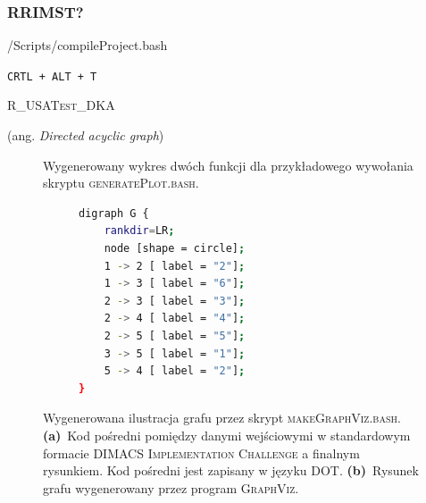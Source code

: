 \subsubsection{RRIMST?}


 \textsf{/Scripts/compileProject.bash}

 \texttt{CRTL + ALT + T}

\textsc{R\_USATest\_DKA}

(ang. \textit{Directed acyclic graph})


\begin{figure}[!htbp]
	\null\hfill
	\hfill\null
	\caption{
		Wygenerowany wykres dwóch funkcji dla przykładowego wywołania skryptu \textsc{generatePlot.bash}.
	}
\end{figure}


\begin{figure}[!htbp]
	\null\hfill
	\begin{subfigure}[b]{0.49\textwidth}
		\footnotesize
		\begin{lstlisting}[language=bash]
digraph G {
	rankdir=LR;
	node [shape = circle];
	1 -> 2 [ label = "2"];
	1 -> 3 [ label = "6"];
	2 -> 3 [ label = "3"];
	2 -> 4 [ label = "4"];
	2 -> 5 [ label = "5"];
	3 -> 5 [ label = "1"];
	5 -> 4 [ label = "2"];
}
		\end{lstlisting}
		\caption{}
		\label{fig:graphViz:a}
	\end{subfigure}
	\hfill
	\begin{subfigure}[b]{0.49\textwidth}
		\vspace{1em}
		\caption{}
		\label{fig:graphViz:b}
	\end{subfigure}
	\hfill\null
	\caption{
		Wygenerowana ilustracja grafu przez skrypt \textsc{makeGraphViz.bash}.
		\textbf{(a)}~Kod pośredni pomiędzy danymi wejściowymi w standardowym formacie \textsc{DIMACS Implementation Challenge} a finalnym rysunkiem. Kod pośredni jest zapisany w języku \textsc{DOT}.
		\textbf{(b)}~Rysunek grafu wygenerowany przez program \textsc{GraphViz}.
	}
	\label{fig:graphViz}
\end{figure}

